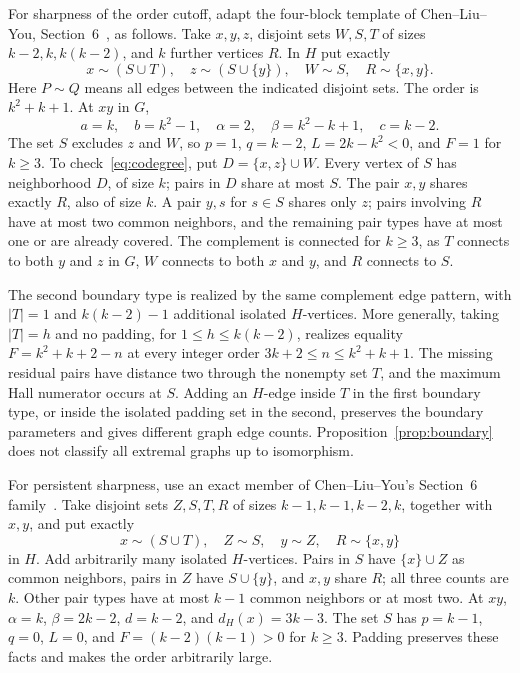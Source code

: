 \documentclass[11pt]{article}
\theoremstyle{remark}
\begin{document}
For sharpness of the order cutoff, adapt the four-block template of Chen--Liu--You, Section~6~\cite{chen}, as follows. Take $x,y,z$, disjoint sets $W,S,T$ of sizes $k-2,k,k(k-2)$, and $k$ further vertices $R$. In $H$ put exactly
\[
 x\mathrel{\sim}(S\cup T),\quad z\mathrel{\sim}(S\cup\{y\}),\quad
 W\mathrel{\sim}S,\quad R\mathrel{\sim}\{x,y\}.
\]
Here $P\mathrel{\sim}Q$ means all edges between the indicated disjoint sets. The order is $k^2+k+1$. At $xy$ in $G$,
\[
 a=k,\quad b=k^2-1,\quad\alpha=2,\quad
 \beta=k^2-k+1,\quad c=k-2.
\]
The set $S$ excludes $z$ and $W$, so $p=1$, $q=k-2$, $L=2k-k^2<0$, and $F=1$ for $k\ge3$.
To check~\eqref{eq:codegree}, put $D=\{x,z\}\cup W$. Every vertex of $S$ has neighborhood $D$, of size $k$; pairs in $D$ share at most $S$. The pair $x,y$ shares exactly $R$, also of size $k$. A pair $y,s$ for $s\in S$ shares only $z$; pairs involving $R$ have at most two common neighbors, and the remaining pair types have at most one or are already covered. The complement is connected for $k\ge3$, as $T$ connects to both $y$ and $z$ in $G$, $W$ connects to both $x$ and $y$, and $R$ connects to $S$.

The second boundary type is realized by the same complement edge pattern, with $|T|=1$ and $k(k-2)-1$ additional isolated $H$-vertices. More generally, taking $|T|=h$ and no padding, for $1\le h\le k(k-2)$, realizes equality $F=k^2+k+2-n$ at every integer order $3k+2\le n\le k^2+k+1$. The missing residual pairs have distance two through the nonempty set $T$, and the maximum Hall numerator occurs at $S$. Adding an $H$-edge inside $T$ in the first boundary type, or inside the isolated padding set in the second, preserves the boundary parameters and gives different graph edge counts. Proposition~\ref{prop:boundary} does not classify all extremal graphs up to isomorphism.

For persistent sharpness, use an exact member of Chen--Liu--You's Section~6 family~\cite{chen}. Take disjoint sets $Z,S,T,R$ of sizes $k-1,k-1,k-2,k$, together with $x,y$, and put exactly
\[
 x\mathrel{\sim}(S\cup T),\quad Z\mathrel{\sim}S,\quad y\mathrel{\sim}Z,
 \quad R\mathrel{\sim}\{x,y\}
\]
in $H$. Add arbitrarily many isolated $H$-vertices. Pairs in $S$ have $\{x\}\cup Z$ as common neighbors, pairs in $Z$ have $S\cup\{y\}$, and $x,y$ share $R$; all three counts are $k$. Other pair types have at most $k-1$ common neighbors or at most two. At $xy$, $\alpha=k$, $\beta=2k-2$, $d=k-2$, and $d_H(x)=3k-3$. The set $S$ has $p=k-1$, $q=0$, $L=0$, and $F=(k-2)(k-1)>0$ for $k\ge3$. Padding preserves these facts and makes the order arbitrarily large.
\end{document}
